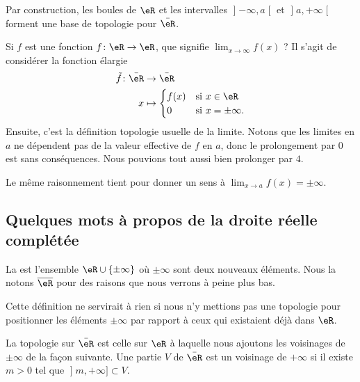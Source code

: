 Par construction, les boules de \( \eR\) et les intervalles \( \mathopen] -\infty , a \mathclose[\) et \( \mathopen] a , +\infty \mathclose[\) forment une base de topologie pour \( \bar \eR\).

Si \( f\) est une fonction \( f\colon \eR\to \eR\), que signifie \( \lim_{x\to \infty} f(x)\) ? Il s'agit de considérer la fonction élargie
\begin{equation}
	\begin{aligned}
		\tilde f\colon \bar \eR & \to \bar\eR                        \\
		x                       & \mapsto \begin{cases}
			f(x) & \text{si } x\in \eR     \\
			0    & \text{si } x=\pm\infty.
		\end{cases}
	\end{aligned}
\end{equation}
Ensuite, c'est la définition topologie usuelle de la limite. Notons que les limites en \( a\) ne dépendent pas de la valeur effective de \( f\) en \( a\), donc le prolongement par \( 0\) est sans conséquences. Nous pouvions tout aussi bien prolonger par \( 4\).

Le même raisonnement tient pour donner un sens à \( \lim_{x\to a} f(x)=\pm \infty\).

\subsection{Quelques mots à propos de la droite réelle complétée}

\begin{definition}
	La  est l'ensemble \( \eR\cup\{ \pm \infty \}\) où \( \pm\infty\) sont deux nouveaux éléments. Nous la notons \( \overline{ \eR }\) pour des raisons que nous verrons à peine plus bas.
\end{definition}

Cette définition ne servirait à rien si nous n'y mettions pas une topologie pour positionner les éléments \( \pm\infty\) par rapport à ceux qui existaient déjà dans \( \eR\).

\begin{definition}
	La topologie sur \(\bar \eR\) est celle sur \( \eR\) à laquelle nous ajoutons les voisinages de \( \pm\infty\) de la façon suivante. Une partie \( V\) de \( \bar \eR\) est un voisinage de \( +\infty\) si il existe \( m>0\) tel que \( \mathopen] m , +\infty \mathclose]\subset V\).
\end{definition}


